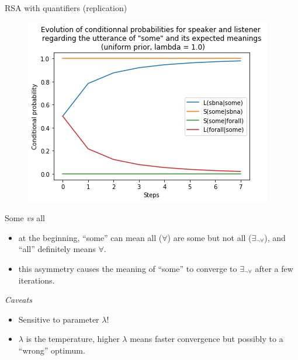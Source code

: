 \documentclass[xcolor=table, hyperref={pdfpagelabels=false}]{beamer}
\begin{document}
\begin{frame}{RSA with quantifiers (replication)}
\begin{minipage}{.5\textwidth}
	\begin{figure}
	\includegraphics[width=\textwidth]{./images/quantification_lambda_1.png}
\end{figure}
\end{minipage}
\begin{minipage}{.48\textwidth}
	\begin{block}{Some \textit{vs} all}
	\begin{itemize}
		\item at the beginning, ``some'' can mean all ($\forall$) are some but not all ($\exists_{\neg \forall}$), and ``all'' definitely means $\forall$.
		\item this asymmetry causes the meaning of ``some'' to converge to $\exists_{\neg \forall}$ after a few iterations.
	\end{itemize}
\end{block}
\end{minipage}
\begin{alertblock}{\textit{Caveats}}
	\begin{itemize}
		\item Sensitive to parameter $\lambda$!
		\item $\lambda$ is the temperature, higher $\lambda$ means faster convergence but possibly to a ``wrong'' optimum.
	\end{itemize}
\end{alertblock}
\end{frame}
\end{document}
